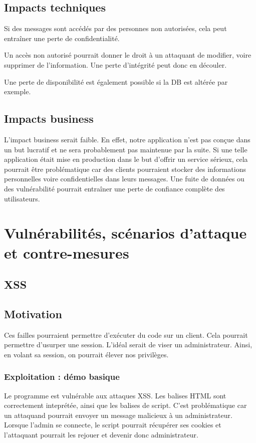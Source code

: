 \documentclass[12pt]{article}
\begin{document}
\subsection{Impacts techniques}
Si des messages sont accédés par des personnes non autorisées, cela peut entraîner une perte de confidentialité.

Un accès non autorisé pourrait donner le droit à un attaquant de modifier, voire supprimer de l'information. Une perte d'intégrité peut donc en découler.

Une perte de disponibilité est également possible si la DB est altérée par exemple.
\subsection{Impacts business}
L'impact business serait faible. En effet, notre application n'est pas conçue dans un but lucratif et ne sera probablement pas maintenue par la suite. Si une telle application était mise en production dans le but d'offrir un service sérieux, cela pourrait être problématique car des clients pourraient stocker des informations personnelles voire confidentielles  dans leurs messages. Une fuite de données ou des vulnérabilité pourrait entraîner une perte de confiance complète des utilisateurs.

\section{Vulnérabilités, scénarios d'attaque et contre-mesures}
\subsection{XSS}
\subsection{Motivation}
Ces failles pourraient permettre d'exécuter du code sur un client. Cela pourrait permettre d'usurper une session. L'idéal serait de viser un administrateur. Ainsi, en volant sa session, on pourrait élever nos privilèges.
\subsubsection{Exploitation : démo basique}
Le programme est vulnérable aux attaques XSS. Les balises HTML sont correctement inteprétée, ainsi que les balises de script. C'est problématique car un attaquand pourrait envoyer un message malicieux à un administrateur. Lorsque l'admin se connecte, le script pourrait récupérer ses cookies et l'attaquant pourrait les rejouer et devenir donc administrateur.
\end{document}
